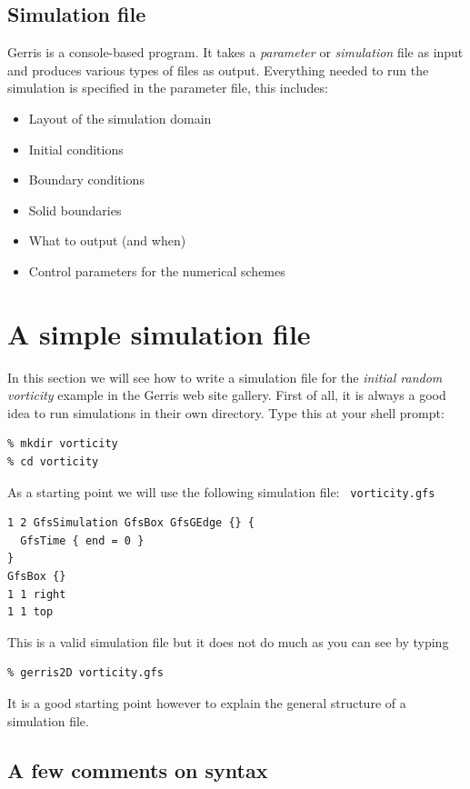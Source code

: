 \documentclass[a4paper]{article}
\begin{document}
\subsection{Simulation file}

Gerris is a console-based program. It takes a {\em parameter} or {\em
simulation} file as input and produces various types of files as output.
Everything needed to run the simulation is specified in the parameter
file, this includes:
\begin{itemize}
\item Layout of the simulation domain
\item Initial conditions
\item Boundary conditions
\item Solid boundaries
\item What to output (and when)
\item Control parameters for the numerical schemes
\end{itemize}

\section{A simple simulation file}

In this section we will see how to write a simulation file for the
{\em initial random vorticity} example in the Gerris web site
gallery. First of all, it is always a good idea to run simulations in
their own directory. Type this at your shell prompt:
\begin{verbatim}
% mkdir vorticity
% cd vorticity
\end{verbatim}
As a starting point we will use the following simulation file: {\tt
vorticity.gfs}
\begin{verbatim}
1 2 GfsSimulation GfsBox GfsGEdge {} {
  GfsTime { end = 0 }
}
GfsBox {}
1 1 right
1 1 top
\end{verbatim}
This is a valid simulation file but it does not do much as you can see 
by typing
\begin{verbatim}
% gerris2D vorticity.gfs
\end{verbatim}
It is a good starting point however to explain the general structure
of a simulation file.

\subsection{A few comments on syntax}
\end{document}
